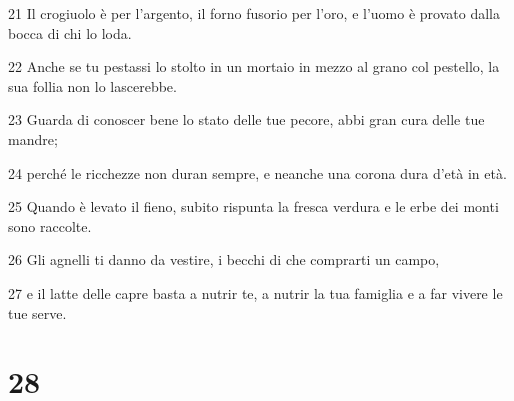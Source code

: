 \par 21 Il crogiuolo è per l'argento, il forno fusorio per l'oro, e l'uomo è provato dalla bocca di chi lo loda.
\par 22 Anche se tu pestassi lo stolto in un mortaio in mezzo al grano col pestello, la sua follia non lo lascerebbe.
\par 23 Guarda di conoscer bene lo stato delle tue pecore, abbi gran cura delle tue mandre;
\par 24 perché le ricchezze non duran sempre, e neanche una corona dura d'età in età.
\par 25 Quando è levato il fieno, subito rispunta la fresca verdura e le erbe dei monti sono raccolte.
\par 26 Gli agnelli ti danno da vestire, i becchi di che comprarti un campo,
\par 27 e il latte delle capre basta a nutrir te, a nutrir la tua famiglia e a far vivere le tue serve.

\chapter{28}

